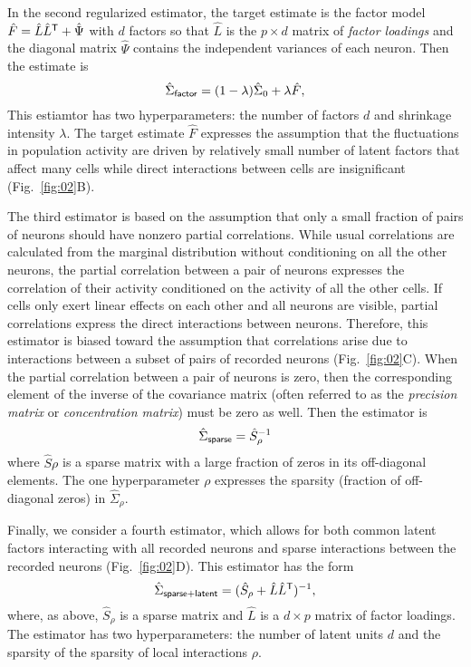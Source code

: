 In the second regularized estimator, the target estimate is the factor model $\hat F = \hat L \hat L^{\sf T} + \hat \Psi$ with $d$ factors so that $\hat L$ is the $p\times d$ matrix of \emph{factor loadings} and the diagonal matrix $\hat \Psi$ contains the independent variances of each neuron.
Then the estimate is 
\begin{equation}
\hat \Sigma_{\sf factor} = (1-\lambda) \hat \Sigma_0 + \lambda \hat F,
\end{equation}
This estiamtor has two hyperparameters: the number of factors $d$ and shrinkage intensity $\lambda$. The target estimate $\hat F$ expresses the assumption that the fluctuations in population activity are driven by relatively small number of latent factors that affect many cells while direct interactions between cells are insignificant (Fig.~\ref{fig:02}B).   

The third estimator is based on the assumption that only a small fraction of pairs of neurons should have nonzero partial correlations.  While usual correlations are calculated from the marginal distribution without conditioning on all the other neurons, the partial correlation between a pair of neurons expresses the correlation of their activity conditioned on the activity of all the other cells.  If cells only exert linear effects on each other and all neurons are visible, partial correlations express the direct interactions between neurons. Therefore, this estimator is biased toward the assumption that correlations arise due to interactions between a subset of pairs of recorded neurons (Fig.~\ref{fig:02}C). When the partial correlation between a pair of neurons is zero, then the corresponding element of the inverse of the covariance matrix (often referred to as the \emph{precision matrix} or \emph{concentration matrix}) must be zero as well. Then the estimator is 
\begin{equation}
\hat\Sigma_{\sf sparse} = \hat S_\rho^{-1}
\end{equation}
where $\hat S\rho$ is a sparse matrix with a large fraction of zeros in its off-diagonal elements. The  one hyperparameter $\rho$ expresses the sparsity (fraction of off-diagonal zeros) in $\hat\Sigma_\rho$.


Finally, we consider a fourth estimator, which allows for both common latent factors interacting with all recorded neurons and sparse interactions between the recorded neurons (Fig.~\ref{fig:02}D). This estimator has the form
\begin{equation}
\hat\Sigma_{\sf sparse+latent} = (\hat S_\rho + \hat L\hat L^{\sf T})^{-1},
\end{equation}
where, as above, $\hat S_\rho$ is a sparse matrix and $\hat L$ is a $d\times p$ matrix of factor loadings. The estimator has two hyperparameters: the number of latent units $d$ and the sparsity of the sparsity of local interactions $\rho$.


